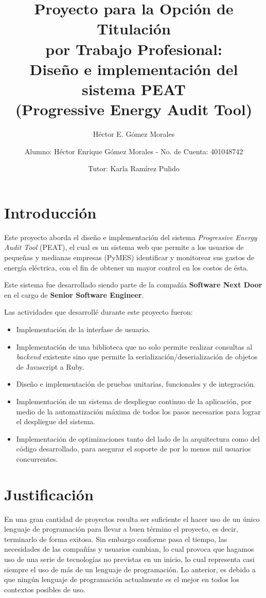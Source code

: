 \documentclass{article}
\author{Héctor E. Gómez Morales}
\title{Proyecto para la Opción de Titulación\\
  por Trabajo Profesional:\\
  Diseño e implementación del sistema PEAT\\
  (Progressive Energy Audit Tool)}
\begin{document}
\author{ Alumno: Héctor Enrique Gómez Morales - No. de Cuenta: 401048742 \and
  Tutor: Karla Ramírez Pulido}
\maketitle
\section{Introducción}
Este proyecto aborda el diseño e implementación del sistema \textit{Progressive
 Energy Audit Tool} (PEAT), el cual es un sistema web que
permite a los usuarios de pequeñas y medianas empresas (PyMES)
identificar y monitorear sus gastos de energía eléctrica, con el fin de obtener
un mayor control en los costos de ésta.

Este sistema fue desarrollado siendo parte de la compañía
\textbf{Software Next Door} en el cargo de \textbf{Senior Software Engineer}.

\vspace{2.5mm}

Las actividades que desarrollé durante este proyecto fueron:
\begin{itemize}
\item Implementación de la interfase de usuario.
\item Implementación de una biblioteca que no solo permite realizar consultas
  al \textit{backend} existente sino que permite la serialización/deserialización
  de objetos de Javascript a Ruby.
\item Diseño e implementación de pruebas unitarias, funcionales y de integración.
\item Implementación de un sistema de despliegue continuo de la aplicación, por
  medio de la automatización máxima de todos los pasos necesarios para lograr
  el despliegue del sistema.
\item Implementación de optimizaciones tanto del lado de la arquitectura como
  del código desarrollado, para asegurar el soporte de por lo menos mil usuarios
  concurrentes.
\end{itemize}

\section{Justificación}
En una gran cantidad de proyectos resulta ser suficiente el hacer uso de un
único lenguaje de programación para llevar a buen término el proyecto, es decir,
terminarlo de forma exitosa. Sin embargo conforme pasa el tiempo, las necesidades
de las compañías y usuarios cambian, lo cual provoca que hagamos uso de una serie de
tecnologías no previstas en un inicio, lo cual representa casi siempre el uso
de más de un lenguaje de programación. Lo anterior, es debido a que ningún
lenguaje de programación actualmente es el mejor en todos los contextos
posibles de uso.
\end{document}
